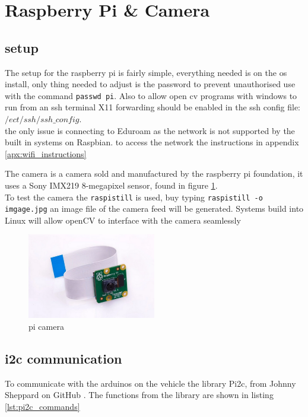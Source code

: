 	\section{Raspberry Pi \& Camera}
\subsection{setup}
\label{sec:pi_setup}
The setup for the raspberry pi is fairly simple, everything needed is on the os install, only thing needed to adjust is the password to prevent unauthorised use with the command \texttt{passwd pi}. Also to allow open cv programs with windows to run from an ssh terminal X11 forwarding should be enabled in the ssh config file: \texttt{$ /ect/ssh/ssh\_config $}. 
\\ 
the only issue is connecting to Eduroam as the network is not supported by the built in systems on Raspbian. to access the network the instructions in appendix \ref{apx:wifi_instructions}


The camera is a camera sold and manufactured by the raspberry pi foundation, it uses a Sony IMX219 8-megapixel sensor\cite{pi_cam_product}, found in figure \ref{fig:pi_camera}.\\
To test the camera the \texttt{raspistill} is used, buy typing \texttt{raspistill -o imgage.jpg} an image file of the camera feed will be generated. Systems build into Linux will allow openCV to interface with the camera seamlessly

\begin{figure}[h]%
	\centering
	\includegraphics[width = 0.5\textwidth]{"assets/pi_camera"}
	\caption{pi camera\cite{pi_cam_product} }
	\label{fig:pi_camera}
\end{figure}

\subsection{i2c communication}
To communicate with the arduinos on the vehicle the library Pi2c, from Johnny Sheppard on GitHub \cite{pi2c}. The functions from the library are shown in listing \ref{lst:pi2c_commands}

